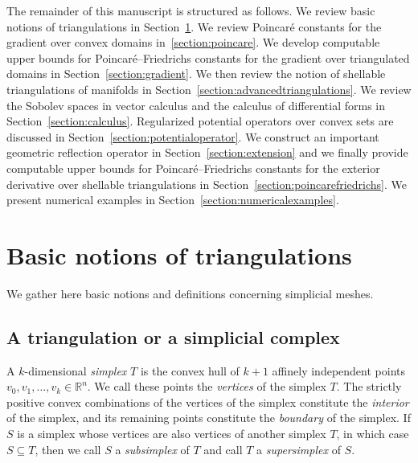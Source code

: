 \documentclass[10pt,letterpaper]{article}
\begin{document}
The remainder of this manuscript is structured as follows.
We review basic notions of triangulations in Section~\ref{section:triangulations}.
We review Poincar\'e constants for the gradient over convex domains in~\ref{section:poincare}.
We develop computable upper bounds for Poincar\'e--Friedrichs constants for the gradient over triangulated domains in Section~\ref{section:gradient}.
We then review the notion of shellable triangulations of manifolds in Section~\ref{section:advancedtriangulations}.
We review the Sobolev spaces in vector calculus and the calculus of differential forms in Section~\ref{section:calculus}.
Regularized potential operators over convex sets are discussed in Section~\ref{section:potentialoperator}.
We construct an important geometric reflection operator in Section~\ref{section:extension}
and we finally provide computable upper bounds for Poincar\'e--Friedrichs constants for the exterior derivative over shellable triangulations in Section~\ref{section:poincarefriedrichs}.
We present numerical examples in Section~\ref{section:numericalexamples}. 






































\section{Basic notions of triangulations}\label{section:triangulations}

We gather here basic notions and definitions concerning simplicial meshes. 
  
\subsection{A triangulation or a simplicial complex}

A ${k}$-dimensional \emph{simplex} $T$ is the convex hull of ${k}+1$ affinely independent points $v_0, v_1, \ldots, v_{{k}} \in \mathbb{R}^{n}$. We call these points the \emph{vertices} of the simplex $T$. 
The strictly positive convex combinations of the vertices of the simplex constitute the \textit{ interior} of the simplex,
and its remaining points constitute the \textit{boundary} of the simplex.
If $S$ is a simplex whose vertices are also vertices of another simplex $T$, in which case $S \subseteq T$, 
then we call $S$ a \textit{subsimplex} of $T$ and call $T$ a \textit{supersimplex} of $S$. 
\end{document}
